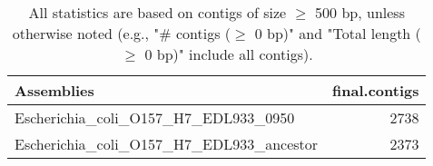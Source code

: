 \documentclass[12pt,a4paper]{article}
\begin{document}
\begin{table}[ht]
\begin{center}
\caption{All statistics are based on contigs of size $\geq$ 500 bp, unless otherwise noted (e.g., "\# contigs ($\geq$ 0 bp)" and "Total length ($\geq$ 0 bp)" include all contigs).}
\begin{tabular}{|l*{1}{|r}|}
\hline
Assemblies & final.contigs \\ \hline
Escherichia\_coli\_O157\_H7\_EDL933\_0950 & 2738 \\ \hline
Escherichia\_coli\_O157\_H7\_EDL933\_ancestor & 2373 \\ \hline
\end{tabular}
\end{center}
\end{table}
\end{document}
